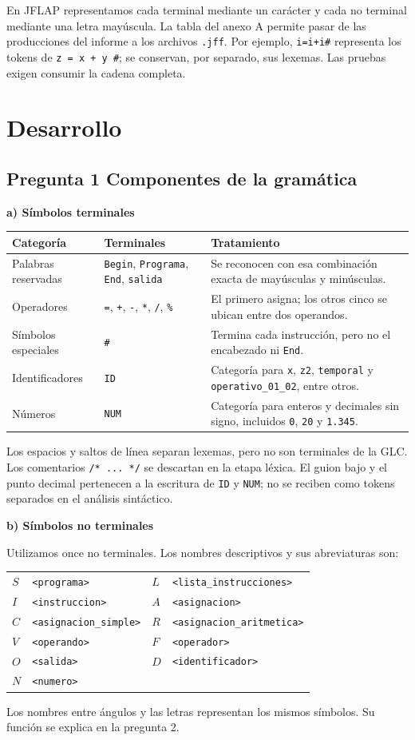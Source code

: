 \documentclass[11pt,letterpaper]{article}
\newcommand{\cod}[1]{\texttt{#1}}
\newcommand{\nt}[1]{\texttt{<#1>}}
\newcommand{\subtitulo}[1]{\vspace{5pt}\textbf{#1}\par\nopagebreak[4]}
\newcommand{\cab}[1]{\rowcolor{cabecera}#1}
\begin{document}
En JFLAP representamos cada terminal mediante un carácter y cada no terminal mediante una letra mayúscula. La tabla del anexo A permite pasar de las producciones del informe a los archivos \cod{.jff}. Por ejemplo, \cod{i=i+i\#} representa los tokens de \cod{z = x + y \#}; se conservan, por separado, sus lexemas. Las pruebas exigen consumir la cadena completa.

\newpage
\section{Desarrollo}
\subsection{Pregunta 1 Componentes de la gramática}
\subtitulo{a) Símbolos terminales}
\begin{tabularx}{\textwidth}{|p{2.8cm}|p{4.7cm}|X|}\hline
\cab{\textbf{Categoría}&\textbf{Terminales}&\textbf{Tratamiento}}\\\hline
Palabras reservadas&\cod{Begin}, \cod{Programa}, \cod{End}, \cod{salida}&Se reconocen con esa combinación exacta de mayúsculas y minúsculas.\\\hline
Operadores&\cod{=}, \cod{+}, \cod{-}, \cod{*}, \cod{/}, \cod{\%}&El primero asigna; los otros cinco se ubican entre dos operandos.\\\hline
Símbolos especiales&\cod{\#}&Termina cada instrucción, pero no el encabezado ni \cod{End}.\\\hline
Identificadores&\cod{ID}&Categoría para \cod{x}, \cod{z2}, \cod{temporal} y \cod{operativo\_01\_02}, entre otros.\\\hline
Números&\cod{NUM}&Categoría para enteros y decimales sin signo, incluidos \cod{0}, \cod{20} y \cod{1.345}.\\\hline
\end{tabularx}

Los espacios y saltos de línea separan lexemas, pero no son terminales de la GLC. Los comentarios \cod{/* ... */} se descartan en la etapa léxica. El guion bajo y el punto decimal pertenecen a la escritura de \cod{ID} y \cod{NUM}; no se reciben como tokens separados en el análisis sintáctico.

\subtitulo{b) Símbolos no terminales}
Utilizamos once no terminales. Los nombres descriptivos y sus abreviaturas son:
\begin{center}\small
\begin{tabular}{ll@{\qquad}ll}
$S$&\nt{programa}&$L$&\nt{lista\_instrucciones}\\
$I$&\nt{instruccion}&$A$&\nt{asignacion}\\
$C$&\nt{asignacion\_simple}&$R$&\nt{asignacion\_aritmetica}\\
$V$&\nt{operando}&$F$&\nt{operador}\\
$O$&\nt{salida}&$D$&\nt{identificador}\\
$N$&\nt{numero}&&
\end{tabular}\end{center}
Los nombres entre ángulos y las letras representan los mismos símbolos. Su función se explica en la pregunta 2.
\end{document}
